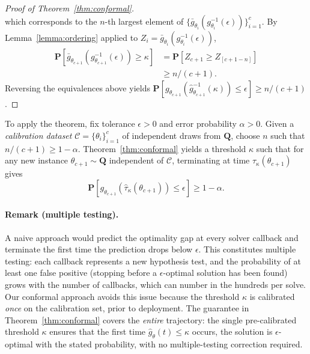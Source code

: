 \documentclass[12pt]{article}
\theoremstyle{definition}
\theoremstyle{remark}
\newcommand{\paramdist}{\mathbf{Q}}
\newcommand{\param}{\theta}
\newcommand{\Prob}{\mathbf{P}}
\newcommand{\truegap}{g}
\newcommand{\predgap}{\hat{g}}
\newcommand{\tol}{\epsilon}
\newcommand{\errorprob}{\alpha}
\newcommand{\pst}{\hat{\tau}}
\newcommand{\calibration}{\mathcal{C}}
\newcommand{\lt}{\kappa}
\newcommand{\ncalib}{c}
\newcommand{\rollmin}{\bar{g}}
\newcommand{\change}[1]{#1}
\newcommand{\paramdist}{\mathbf{Q}}
\newcommand{\param}{\theta}
\newcommand{\Prob}{\mathbf{P}}
\newcommand{\truegap}{g}
\newcommand{\predgap}{\hat{g}}
\newcommand{\tol}{\epsilon}
\newcommand{\errorprob}{\alpha}
\newcommand{\pst}{\hat{\tau}}
\newcommand{\calibration}{\mathcal{C}}
\newcommand{\lt}{\kappa}
\newcommand{\ncalib}{c}
\newcommand{\rollmin}{\bar{g}}
\newcommand{\change}[1]{#1}
\theoremstyle{plain}
\theoremstyle{definition}
\theoremstyle{remark}
\begin{document}
\begin{proof}[Proof of Theorem~\ref{thm:conformal}]
\begin{equation*}
    \end{equation*}
    which corresponds to the $n$-th largest element of $\{\rollmin_{\param_i}(\truegap_{\param_i}^{-1}(\tol))\}_{i=1}^\ncalib$.
    By Lemma~\ref{lemma:ordering} applied to $Z_i = \rollmin_{\param_i}(\truegap^{-1}_{\param_i}(\tol))$,
    \begin{align*}
    \Prob[\rollmin_{\param_{\ncalib+1}}(\truegap^{-1}_{\param_{\ncalib + 1}}(\tol)) \ge \lt] &= \Prob[Z_{\ncalib + 1} \ge Z_{[\ncalib + 1 - n]}] \\ & \ge n / (\ncalib + 1).
    \end{align*}
    Reversing the equivalences above yields $\Prob[\truegap_{\param_{\ncalib+1}}(\predgap^{-1}_{\param_{\ncalib+1}}(\lt)) \le \tol] \ge n/(\ncalib + 1)$.
\end{proof}

To apply the theorem, fix tolerance $\tol > 0$ and error probability $\errorprob > 0$.
Given a \emph{calibration dataset} $\calibration = \{\param_i\}_{i=1}^\ncalib$ of independent draws from $\paramdist$, choose $n$ such that $n/(\ncalib+1) \ge 1 - \errorprob$.
Theorem~\ref{thm:conformal} yields a threshold $\lt$ such that for any new instance $\param_{\ncalib+1} \sim \paramdist$ independent of $\calibration$, terminating at time $\pst_{\lt}(\param_{\ncalib+1})$ gives
\begin{equation*}
    \Prob[\truegap_{\param_{\ncalib+1}}(\pst_{\lt}(\param_{\ncalib+1})) \le \tol] \ge 1 - \errorprob.
\end{equation*}

\change{
\paragraph{Remark (multiple testing).}
A naive approach would predict the optimality gap at every solver callback and terminate the first time the prediction drops below $\tol$.
This constitutes multiple testing: each callback represents a new hypothesis test, and the probability of at least one false positive (stopping before a $\tol$-optimal solution has been found) grows with the number of callbacks, which can number in the hundreds per solve.
Our conformal approach avoids this issue because the threshold $\lt$ is calibrated \emph{once} on the calibration set, prior to deployment.
The guarantee in Theorem~\ref{thm:conformal} covers the \emph{entire} trajectory: the single pre-calibrated threshold $\lt$ ensures that the first time $\predgap_\param(t) \le \lt$ occurs, the solution is $\tol$-optimal with the stated probability, with no multiple-testing correction required.
}
\end{document}
